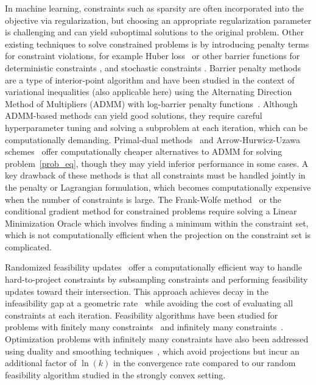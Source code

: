 \documentclass{article}
\theoremstyle{plain}
\theoremstyle{definition}
\theoremstyle{remark}
\begin{document}
In machine learning, constraints such as sparsity are often incorporated into the objective via regularization, but choosing an appropriate regularization parameter is challenging and can yield suboptimal solutions to the original problem. Other existing techniques to solve constrained problems is by introducing penalty terms for constraint violations, for example Huber loss~\cite{tatarenko2021smooth, nedich2023huber} or other barrier functions for deterministic constraints \cite{freund2004penalty, o2021log}, and stochastic constraints \cite{usmanova2024log}. Barrier penalty methods are a type of interior-point algorithm and have been studied in the context of variational inequalities (also applicable here) using the Alternating Direction Method of Multipliers (ADMM) with log-barrier penalty functions~\cite{yang2022solving}. Although ADMM-based methods can yield good solutions, they require careful hyperparameter tuning and solving a subproblem at each iteration, which can be computationally demanding. Primal-dual methods~\cite{zhang2022solving, li2024stochastic} and Arrow-Hurwicz-Uzawa schemes~\cite{he2022convergence, zhang2022near} offer computationally cheaper alternatives to ADMM for solving problem~\eqref{prob_eq}, though they may yield inferior performance in some cases. A key drawback of these methods is that all constraints must be handled jointly in the penalty or Lagrangian formulation, which becomes computationally expensive when the number of constraints is large. The Frank-Wolfe method~\cite{beznosikov2024sarah, nazykov2024stochastic, freund2016new, garber2015faster} or the conditional gradient method \cite{vladarean2020conditional} for constrained problems require solving a Linear Minimization Oracle which involves finding a minimum within the constraint set, which is not computationally efficient when the projection on the constraint set is complicated.

Randomized feasibility updates~\cite{polyak2001random} offer a computationally efficient way to handle hard-to-project constraints by subsampling constraints and performing feasibility updates toward their intersection. This approach achieves decay in the infeasibility gap at a geometric rate~\cite{nedic2010random, renegar2021different, chakraborty2024randomized} while avoiding the cost of evaluating all constraints at each iteration. Feasibility algorithms have been studied for problems with finitely many constraints~\cite{polyak2001random, nedic2011random, nedic2019random} and infinitely many constraints~\cite{chakraborty2024randomized, necoara2022stochastic}. Optimization problems with infinitely many constraints have also been addressed using duality and smoothing techniques~\cite{fercoq2019almost}, which avoid projections but incur an additional factor of $\ln(k)$ in the convergence rate compared to our random feasibility algorithm studied in the strongly convex setting.
\end{document}
